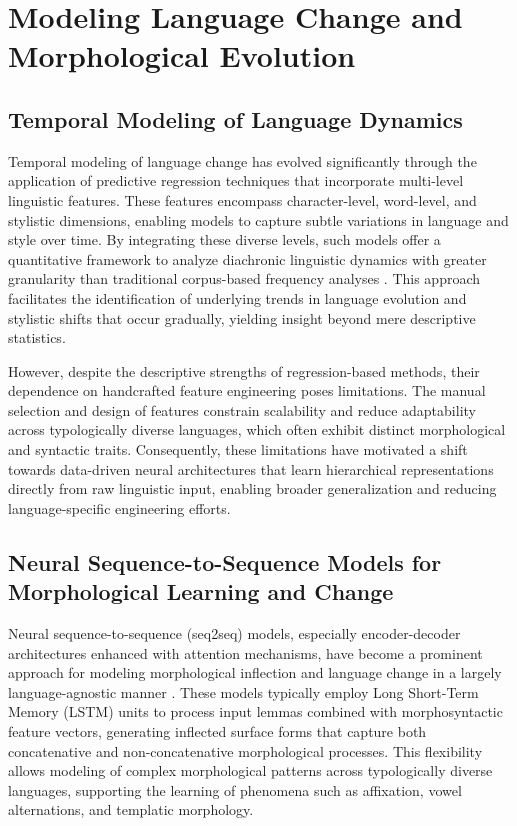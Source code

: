 \documentclass[sigconf]{acmart}
\begin{document}
\section{Modeling Language Change and Morphological Evolution}

\subsection{Temporal Modeling of Language Dynamics}

Temporal modeling of language change has evolved significantly through the application of predictive regression techniques that incorporate multi-level linguistic features. These features encompass character-level, word-level, and stylistic dimensions, enabling models to capture subtle variations in language and style over time. By integrating these diverse levels, such models offer a quantitative framework to analyze diachronic linguistic dynamics with greater granularity than traditional corpus-based frequency analyses \cite{ref41}. This approach facilitates the identification of underlying trends in language evolution and stylistic shifts that occur gradually, yielding insight beyond mere descriptive statistics.

However, despite the descriptive strengths of regression-based methods, their dependence on handcrafted feature engineering poses limitations. The manual selection and design of features constrain scalability and reduce adaptability across typologically diverse languages, which often exhibit distinct morphological and syntactic traits. Consequently, these limitations have motivated a shift towards data-driven neural architectures that learn hierarchical representations directly from raw linguistic input, enabling broader generalization and reducing language-specific engineering efforts.

\subsection{Neural Sequence-to-Sequence Models for Morphological Learning and Change}

Neural sequence-to-sequence (seq2seq) models, especially encoder-decoder architectures enhanced with attention mechanisms, have become a prominent approach for modeling morphological inflection and language change in a largely language-agnostic manner \cite{ref42}. These models typically employ Long Short-Term Memory (LSTM) units to process input lemmas combined with morphosyntactic feature vectors, generating inflected surface forms that capture both concatenative and non-concatenative morphological processes. This flexibility allows modeling of complex morphological patterns across typologically diverse languages, supporting the learning of phenomena such as affixation, vowel alternations, and templatic morphology.
\end{document}
